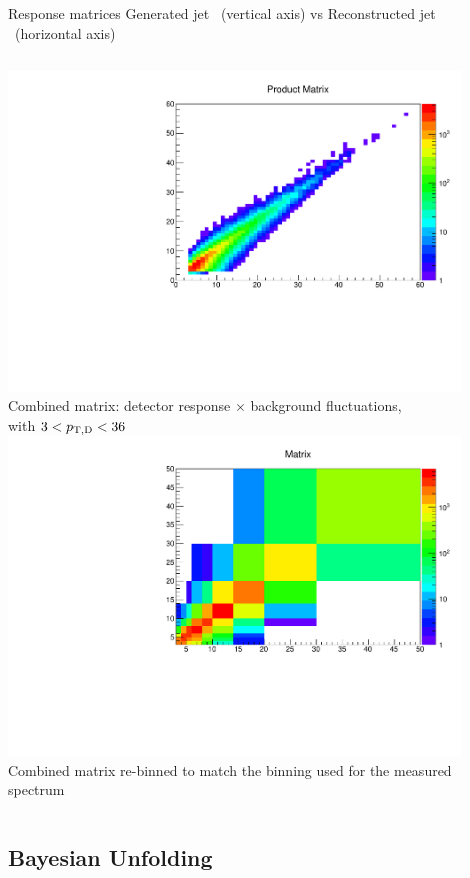 \documentclass[xcolor={usenames,dvipsnames}, aspectratio=169]{beamer}
\begin{document}
\begin{frame}{Response matrices}
Generated jet \pt\ (vertical axis) vs Reconstructed jet \pt\ (horizontal axis)
\begin{columns}
\centering
\includegraphics[width=0.9\textwidth]{img/pPb/productMatrix.pdf}\\
\small
Combined matrix: detector response $\times$ background fluctuations, \\
with $3<p_{\mathrm{T,D}}<36$~\GeVc
{}
\centering
\includegraphics[width=0.9\textwidth]{img/pPb/productMatrixRebinned.pdf}\\
\small
Combined matrix re-binned to match the binning used for the measured spectrum
\end{columns}
\end{frame}

\subsection{Bayesian Unfolding}
\end{document}
